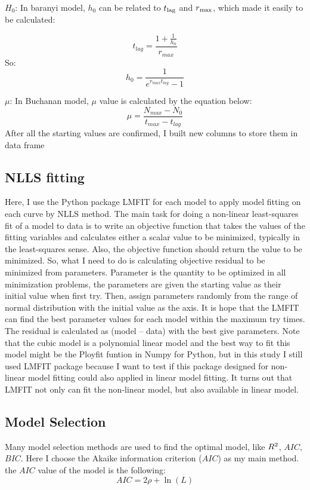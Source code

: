\documentclass[11pt]{article}
\begin{document}
    $H_0$: In baranyi model, $h_0$ can be related to $t\textsubscript{lag}$ and $r\textsubscript{max}$, which made it easily to be calculated:
    
    \begin{equation}
	    t_{lag}= \frac{1+\frac{1}{h_0}}{r_{max}}
	\end{equation}
	So:
	\begin{equation}
	    h_0 = \frac{1}{e^{r_{max}t_{lag}}-1}
	\end{equation}
	
	$\mu$:  In Buchanan model, $\mu$ value is calculated by the equation below\citep{damert1994abacus}:
	\begin{equation}
	    \mu = \frac{N_{max}-N_0}{t_{max}-t_{lag}}
	\end{equation}
	After all the starting values are confirmed, I built new columns to store them in data frame
	
	\subsection{NLLS fitting}
	Here, I use the Python package LMFIT\citep{newville2016lmfit} for each model to apply model fitting on each curve by NLLS method. The main task for doing a non-linear least-squares fit of a model to data is to write an objective function that takes the values of the fitting variables and calculates either a scalar value to be minimized, typically in the least-squares sense. Also, the objective function should return the value to be minimized. So, what I need to do is calculating objective residual to be minimized from parameters. Parameter is the quantity to be optimized in all minimization problems, the parameters are given the starting value as their initial value when first try. Then, assign parameters randomly from the range of normal distribution with the initial value as the axis. It is hope that the LMFIT can find the best parameter values for each model within the maximum try times. The residual is calculated as (model – data) with the best give parameters.
	Note that the cubic model is a polynomial linear model and the best way to fit this model might be the Ployfit funtion in Numpy for Python, but in this study I still used LMFIT package because I want to test if this package designed for non-linear model fitting could also applied in linear model fitting. It turns out that LMFIT not only can fit the non-linear model, but also available in linear model. 
	
	\subsection{Model Selection}
	Many model selection methods are used to find the optimal model, like $R\textsuperscript{2}$, $AIC$, $BIC$. Here I choose the Akaike information criterion ($AIC$) as my main method. the $AIC$ value of the model is the following:
    \begin{equation}
        AIC = 2\rho+\ln (L)
    \end{equation}
    
\end{document}

